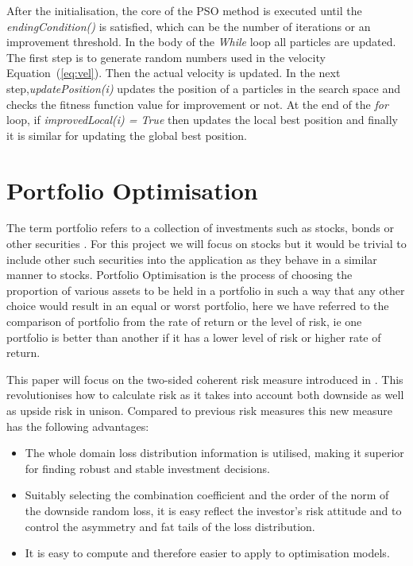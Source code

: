 \documentclass{pdfmx4020}
\begin{document}
  After the initialisation, the core of the PSO method is executed until the \textit{endingCondition()} is satisfied, which can be the number of iterations or an improvement threshold. In the body of the \textit{While} loop all particles are updated. The first step is to generate random numbers used in the velocity Equation~(\ref{eq:vel}). Then the actual velocity is updated. In the next step,\textit{updatePosition(i)} updates the position of a particles in the search space and checks the fitness function value for improvement or not. At the end of the \textit{for} loop, if \textit{improvedLocal(i) = True} then updates the local best position and finally it is similar for updating the global best position. 

  \section{Portfolio Optimisation} %
  \label{sec:portfolio_management}
  The term portfolio refers to a collection of investments such as stocks, bonds or other securities \cite{portfolio}. For this project we will focus on stocks but it would be trivial to include other such securities into the application as they behave in a similar manner to stocks. Portfolio Optimisation is the process of choosing the proportion of various assets to be held in a portfolio in such a way that any other choice would result in an equal or worst portfolio, here we have referred to the comparison of portfolio from the rate of return or the level of risk, ie one portfolio is better than another if it has a lower level of risk or higher rate of return. 

  This paper will focus on the two-sided coherent risk measure introduced in \cite{two_sided_risk}. This revolutionises how to calculate risk as it takes into account both downside as well as upside risk in unison. Compared to previous risk measures this new measure has the following advantages:
  \begin{itemize}
    \item The whole domain loss distribution information is utilised, making it superior for finding robust and stable investment decisions.
    \item Suitably selecting the combination coefficient and the order of the norm of the downside random loss, it is easy reflect the investor's risk attitude and to control the asymmetry and fat tails of the loss distribution.
    \item It is easy to compute and therefore easier to apply to optimisation models.
  \end{itemize}
\end{document}
